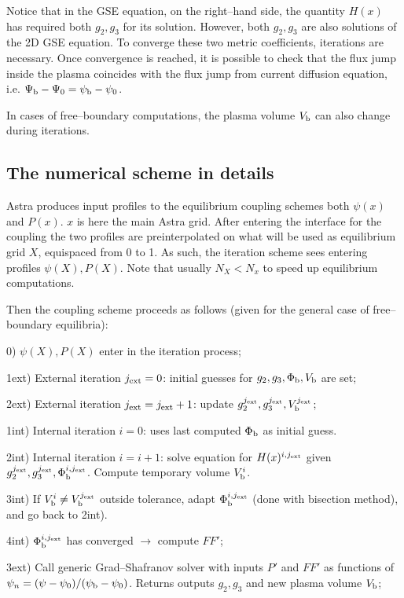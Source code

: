 Notice that in the GSE equation, on the right--hand side, the quantity $H(x)$ has required both $g_2,g_3$
for its solution. However, both $g_2,g_3$ are also solutions of the 2D GSE equation. To converge these two
metric coefficients, iterations are necessary. Once convergence is reached, it is possible to check that the flux jump inside the plasma coincides with
the flux jump from current diffusion equation, i.e. $\Psi_{\rm b}-\Psi_0=\psi_{\rm b}-\psi_0$.

In cases of free--boundary computations, the plasma volume $V_{\rm b}$ can also change during iterations.
%
\subsection{The numerical scheme in details}
Astra produces input profiles to the equilibrium coupling schemes both $\psi(x)$ and $P(x)$. $x$ is here
the main Astra grid.
After entering the interface for the coupling the two profiles are preinterpolated on what will be used as
equilibrium grid $X$, equispaced from 0 to 1. As such, the iteration scheme sees entering profiles
$\psi(X),P(X)$. Note that usually $N_X < N_x$ to speed up equilibrium computations. 

Then the coupling scheme proceeds as follows (given for the general case of free--boundary equilibria):

0) $\psi(X),P(X)$ enter in the iteration process;

1ext) External iteration $j_{\rm ext}=0$: initial guesses for $g_2,g_3,\Phi_{\rm b},V_{\rm b}$ are set;

2ext) External iteration $j_{\rm ext}=j_{\rm ext}+1$: update $g_2^{j_{\rm ext}},g_3^{j_{\rm ext}},V_{\rm b}^{j_{\rm ext}}$;

1int) Internal iteration $i=0$: uses last computed $\Phi_{\rm b}$ as initial guess. 

2int) Internal iteration $i=i+1$: solve equation for $H(x)^{i,j_{\rm ext}}$ given $g_2^{j_{\rm ext}},g_3^{j_{\rm ext}},\Phi_{\rm b}^{i,j_{\rm ext}}$. Compute temporary volume $V_{\rm b}^{i}$. 

3int) If $V_{\rm b}^{i} \neq V_{\rm b}^{j_{\rm ext}}$ outside tolerance, adapt $\Phi_{\rm b}^{i,j_{\rm ext}}$ (done with bisection method), and go back to 2int). 

4int) $\Phi_{\rm b}^{i,j_{\rm ext}}$ has converged $\rightarrow$ compute $FF'$;

3ext) Call generic Grad--Shafranov solver with inputs $P'$ and $FF'$ as functions of $\psi_n=(\psi-\psi_0)/(\psi_{\rm b}-\psi_0)$. Returns outputs $g_2,g_3$ and new plasma volume $V_{\rm b}$;

